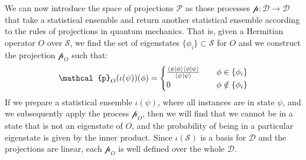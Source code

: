 \documentclass[11pt]{article}
\begin{document}
We can now introduce the space of projections $\mathcal{P}$ as those processes $\mathcal{p} : \mathcal{D} \to \mathcal{D}$ that take a statistical ensemble and return another statistical ensemble according to the rules of projections in quantum mechanics. That is, given a Hermitian operator $O$ over $\mathcal{S}$, we find the set of eigenstates $\{\phi_i\} \subset \mathcal{S}$ for $O$ and we construct the projection $\mathcal{p}_O$ such that:
\begin{equation}\label{transition_probability}
\mathcal{p}_O(\iota(\psi))(\phi) = 
\begin{cases}
\frac{\braket{\psi | \phi} \braket{\phi|\psi}}{\braket{\psi|\psi}} &\quad\phi \in \{\phi_i\}\\
0 &\quad\phi \notin \{\phi_i\}\\
\end{cases}
\end{equation}
If we prepare a statistical ensemble $\iota(\psi)$, where all instances are in state $\psi$, and we subsequently apply the process $\mathcal{p}_O$, then we will find that we cannot be in a state that is not an eigenstate of $O$, and the probability of being in a particular eigenstate is given by the inner product. Since $\iota(\mathcal{S})$ is a basis for $\mathcal{D}$ and the projections are linear, each $\mathcal{p}_O$ is well defined over the whole $\mathcal{D}$.
\end{document}
